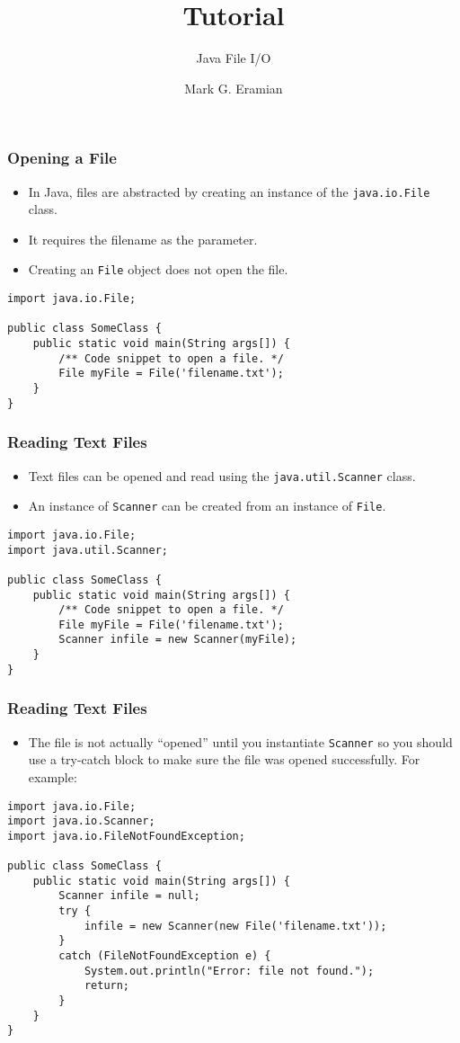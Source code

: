 \documentclass[cmptslides]{cmpt280-slidesandsolutions}
\date{}
\title{Tutorial}
\subtitle{Java File I/O}
\institute{University of Saskatchewan}
\author{Mark G. Eramian}
\begin{document}
\maketitle

\begin{frame}[fragile]
\frametitle{Opening a File}
\begin{itemize}
	\item In Java, files are abstracted by creating an instance of the \lstinline{java.io.File} class.
	\item It requires the filename as the parameter.
	\item Creating an \lstinline{File} object does not open the file.
\end{itemize}	
\begin{lstlisting}[basicstyle=\tt\small,tabsize=4]
import java.io.File;

public class SomeClass {
	public static void main(String args[]) {
		/** Code snippet to open a file. */
		File myFile = File('filename.txt');
	}
}	
\end{lstlisting}

\end{frame}

\begin{frame}[fragile]
\frametitle{Reading Text Files}
\begin{itemize}
	\item Text files can be opened and read using the \lstinline{java.util.Scanner} class.
	\item An instance of \lstinline{Scanner} can be created from an instance of \lstinline{File}.
\end{itemize}	

\begin{lstlisting}[basicstyle=\tt\small,tabsize=4]
import java.io.File;
import java.util.Scanner;

public class SomeClass {
	public static void main(String args[]) {
		/** Code snippet to open a file. */
		File myFile = File('filename.txt');
		Scanner infile = new Scanner(myFile);
	}
}	
\end{lstlisting}
\end{frame}

\begin{frame}[fragile]
\frametitle{Reading Text Files}
\begin{itemize}
	\item The file is not actually ``opened'' until you instantiate \lstinline{Scanner} so you should use a try-catch block to make sure the file was opened successfully.  For example:
\end{itemize}	

\begin{lstlisting}[basicstyle=\tt\scriptsize,tabsize=4]
import java.io.File;
import java.io.Scanner;
import java.io.FileNotFoundException;

public class SomeClass {
	public static void main(String args[]) {
		Scanner infile = null;
		try {
			infile = new Scanner(new File('filename.txt'));
		}
		catch (FileNotFoundException e) {
			System.out.println("Error: file not found.");
			return;
		}
	}
}	
\end{lstlisting}
\end{frame}
\end{document}
